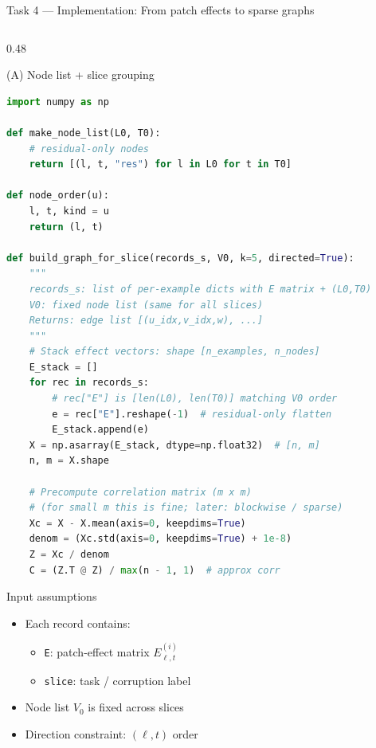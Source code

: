 \documentclass[aspectratio=169,xcolor={dvipsnames}]{beamer}
\begin{document}
\begin{frame}[fragile,shrink=54]{Task 4 — Implementation: From patch effects to sparse graphs}
\small
\begin{columns}[T,onlytextwidth]

\begin{column}{0.48\textwidth}
\begin{block}{(A) Node list + slice grouping}
\footnotesize
\begin{lstlisting}[language=Python,basicstyle=\ttfamily\scriptsize]
import numpy as np

def make_node_list(L0, T0):
    # residual-only nodes
    return [(l, t, "res") for l in L0 for t in T0]

def node_order(u):
    l, t, kind = u
    return (l, t)

def build_graph_for_slice(records_s, V0, k=5, directed=True):
    """
    records_s: list of per-example dicts with E matrix + (L0,T0)
    V0: fixed node list (same for all slices)
    Returns: edge list [(u_idx,v_idx,w), ...]
    """
    # Stack effect vectors: shape [n_examples, n_nodes]
    E_stack = []
    for rec in records_s:
        # rec["E"] is [len(L0), len(T0)] matching V0 order
        e = rec["E"].reshape(-1)  # residual-only flatten
        E_stack.append(e)
    X = np.asarray(E_stack, dtype=np.float32)  # [n, m]
    n, m = X.shape

    # Precompute correlation matrix (m x m)
    # (for small m this is fine; later: blockwise / sparse)
    Xc = X - X.mean(axis=0, keepdims=True)
    denom = (Xc.std(axis=0, keepdims=True) + 1e-8)
    Z = Xc / denom
    C = (Z.T @ Z) / max(n - 1, 1)  # approx corr

\end{lstlisting}
\end{block}

\begin{block}{Input assumptions}
\footnotesize
\begin{itemize}\setlength\itemsep{2pt}
\item Each record contains:
\begin{itemize}
\item \texttt{E}: patch-effect matrix $E^{(i)}_{\ell,t}$
\item \texttt{slice}: task / corruption label
\end{itemize}
\item Node list $V_0$ is fixed across slices
\item Direction constraint: $(\ell,t)$ order
\end{itemize}
\end{block}
\end{column}


\end{columns}
\end{frame}
\end{document}
